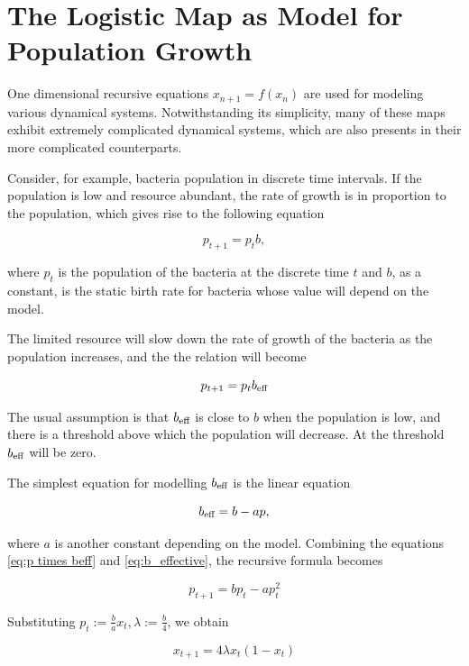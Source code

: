 \section{The Logistic Map as Model for Population Growth}

One dimensional recursive equations $x_{n+1} = f(x_n)$ are used for modeling various dynamical systems. 
Notwithstanding its simplicity, many of these maps exhibit extremely complicated dynamical systems, which are also presents in their more complicated counterparts.

Consider, for example, bacteria population in discrete time intervals. 
If the population is low and resource abundant, the rate of growth is in proportion to the population, which gives rise to the following equation

\begin{equation}\label{eq:1d iterative map}
p_{t+1} = p_{t} b,
\end{equation}

where $p_{t}$ is the population of the bacteria at the discrete time $t$ and $b$, as a constant, is the static birth rate for bacteria whose value will depend on the model.

The limited resource will slow down the rate of growth of the bacteria as the population increases, and the the relation will become 

\begin{equation}\label{eq:p times beff}
	p_{t+1} =  p_{t} b_\text{eff}
\end{equation}

The usual assumption is that $b_\text{eff}$ is close to $b$ when the population is low, and there is a threshold above which the population will decrease. 
At the threshold $b_\text{eff}$ will be zero.

The simplest equation for modelling $b_\text{eff}$ is the linear equation

\begin{equation} \label{eq:b_effective}
b_\text{eff} = b - ap,
\end{equation}

where $a$ is another constant depending on the model.
Combining the equations \eqref{eq:p times beff} and \eqref{eq:b_effective}, the recursive formula becomes 

$$
p_{t+1}  = b p_t - ap_t^2
$$

Substituting $p_{t} := \frac{b}{a} x_{t}, \lambda := \frac{b}{4}$, we obtain

$$
x_{t+1} = 4 \lambda x_t(1-x_t) 
$$

